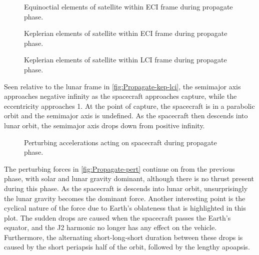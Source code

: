 \begin{figure}
\centering
\def\svgwidth{\figurewidth}

\caption{Equinoctial elements of satellite within ECI frame during propagate phase.}
\label{fig:Propagate-mee}
\end{figure}

\begin{figure}
\centering
\def\svgwidth{\figurewidth}

\caption{Keplerian elements of satellite within ECI frame during propagate phase.}
\label{fig:Propagate-kep}
\end{figure}

\begin{figure}
\centering
\def\svgwidth{\figurewidth}

\caption{Keplerian elements of satellite within LCI frame during propagate phase.}
\label{fig:Propagate-kep-lci}
\end{figure}

Seen relative to the lunar frame in \autoref{fig:Propagate-kep-lci}, the semimajor axis approaches negative infinity as the spacecraft approaches capture, while the eccentricity approaches 1. At the point of capture, the spacecraft is in a parabolic orbit and the semimajor axis is undefined. As the spacecraft then descends into lunar orbit, the semimajor axis drops down from positive infinity.

\begin{figure}
\centering
\def\svgwidth{\figurewidth}

\caption{Perturbing accelerations acting on spacecraft during propagate phase.}
\label{fig:Propagate-pert}
\end{figure}

The perturbing forces in \autoref{fig:Propagate-pert} continue on from the previous phase, with solar and lunar gravity dominant, although there is no thrust present during this phase. As the spacecraft is descends into lunar orbit, unsurprisingly the lunar gravity becomes the dominant force. Another interesting point is the cyclical nature of the force due to Earth's oblateness that is highlighted in this plot. The sudden drops are caused when the spacecraft passes the Earth's equator, and the J2 harmonic no longer has any effect on the vehicle. Furthermore, the alternating short-long-short duration between these drops is caused by the short periapsis half of the orbit, followed by the lengthy apoapsis.

%

